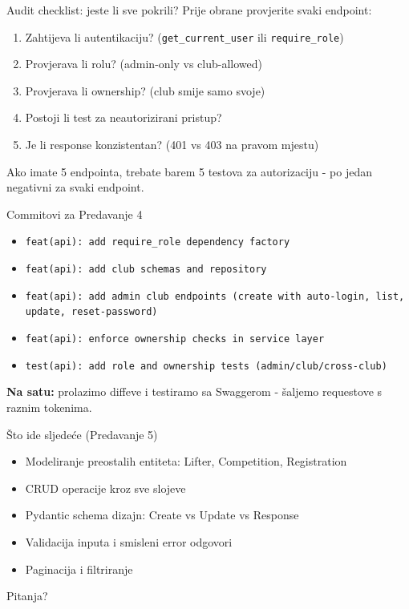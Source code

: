 \begin{frame}{Audit checklist: jeste li sve pokrili?}
Prije obrane provjerite svaki endpoint:
\begin{enumerate}
  \item Zahtijeva li autentikaciju? (\texttt{get\_current\_user} ili \texttt{require\_role})
  \item Provjerava li rolu? (admin-only vs club-allowed)
  \item Provjerava li ownership? (club smije samo svoje)
  \item Postoji li test za neautorizirani pristup?
  \item Je li response konzistentan? (401 vs 403 na pravom mjestu)
\end{enumerate}

\vspace{0.4em}
Ako imate 5 endpointa, trebate barem 5 testova za autorizaciju - po jedan negativni za svaki endpoint.
\end{frame}

\begin{frame}{Commitovi za Predavanje 4}
\begin{itemize}
  \item \texttt{feat(api): add require\_role dependency factory}
  \item \texttt{feat(api): add club schemas and repository}
  \item \texttt{feat(api): add admin club endpoints (create with auto-login, list, update, reset-password)}
  \item \texttt{feat(api): enforce ownership checks in service layer}
  \item \texttt{test(api): add role and ownership tests (admin/club/cross-club)}
\end{itemize}

\vspace{0.6em}
\textbf{Na satu:} prolazimo diffeve i testiramo sa Swaggerom - šaljemo requestove s raznim tokenima.
\end{frame}

\begin{frame}{Što ide sljedeće (Predavanje 5)}
\begin{itemize}
  \item Modeliranje preostalih entiteta: Lifter, Competition, Registration
  \item CRUD operacije kroz sve slojeve
  \item Pydantic schema dizajn: Create vs Update vs Response
  \item Validacija inputa i smisleni error odgovori
  \item Paginacija i filtriranje
\end{itemize}

\vspace{0.8em}
\begin{center}
\Large Pitanja?
\end{center}
\end{frame}


